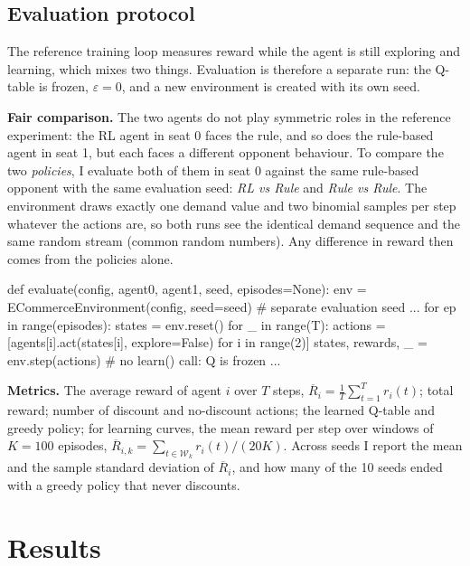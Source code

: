 \documentclass[11pt, a4paper]{article}
\begin{document}
\subsection{Evaluation protocol}

The reference training loop measures reward while the agent is still exploring and learning, which mixes two things. Evaluation is therefore a separate run: the Q-table is frozen, $\varepsilon = 0$, and a new environment is created with its own seed.

\textbf{Fair comparison.} The two agents do not play symmetric roles in the reference experiment: the RL agent in seat 0 faces the rule, and so does the rule-based agent in seat 1, but each faces a different opponent behaviour. To compare the two \emph{policies}, I evaluate both of them in seat 0 against the same rule-based opponent with the same evaluation seed: \emph{RL vs Rule} and \emph{Rule vs Rule}. The environment draws exactly one demand value and two binomial samples per step whatever the actions are, so both runs see the identical demand sequence and the same random stream (common random numbers). Any difference in reward then comes from the policies alone.

\begin{codeblock}
def evaluate(config, agent0, agent1, seed, episodes=None):
    env = ECommerceEnvironment(config, seed=seed)     # separate evaluation seed
    ...
    for ep in range(episodes):
        states = env.reset()
        for _ in range(T):
            actions = [agents[i].act(states[i], explore=False) for i in range(2)]
            states, rewards, _ = env.step(actions)    # no learn() call: Q is frozen
            ...
\end{codeblock}

\textbf{Metrics.} The average reward of agent $i$ over $T$ steps, $\overline{R}_i = \frac{1}{T}\sum_{t=1}^{T} r_i(t)$; total reward; number of discount and no-discount actions; the learned Q-table and greedy policy; for learning curves, the mean reward per step over windows of $K = 100$ episodes, $\overline{R}_{i,k} = \sum_{t \in \mathcal{W}_k} r_i(t) / (20K)$. Across seeds I report the mean and the sample standard deviation of $\overline{R}_i$, and how many of the 10 seeds ended with a greedy policy that never discounts.

\section{Results}
\end{document}
